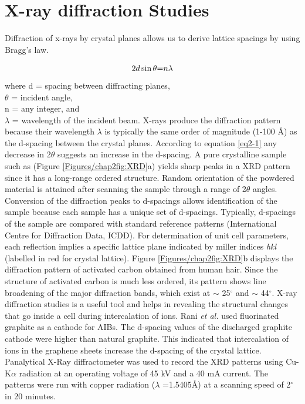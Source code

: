 \section{X-ray diffraction Studies}
Diffraction of x-rays by crystal planes allows us to derive lattice spacings by using Bragg's law. 

 \begin{equation} \label{eq2-1}
     2d\sin\theta \text= n{\lambda}
 \end{equation}
 where d = spacing between diffracting planes,\\
$\theta$ = incident angle,\\ 
n = any integer, and \\
$\lambda$ = wavelength of the incident beam. X-rays produce the diffraction pattern because their wavelength $\lambda$ is typically the same order of magnitude (1-100 \AA) as the d-spacing between the crystal planes. According to equation \ref{eq2-1} any decrease in 2$\theta$ suggests an increase in the d-spacing. 
A pure crystalline sample such as  (Figure \ref{Figures/chap2fig:XRD}a) yields sharp peaks in a XRD pattern since it has a long-range ordered structure. Random orientation of the powdered material is attained after scanning the sample through a range of 2$\theta$ angles. Conversion of the diffraction peaks to d-spacings allows identification of the sample because each sample has a unique set of d-spacings. Typically, d-spacings of the sample are compared with standard reference patterns (International Centre for Diffraction Data, ICDD). For determination of unit cell parameters, each reflection implies a specific lattice plane indicated by miller indices \textit{hkl} (labelled in red  for  crystal lattice). Figure \ref{Figures/chap2fig:XRD}b displays the diffraction pattern of activated carbon obtained from human hair. Since the structure of activated carbon is much less ordered, its pattern shows line broadening of the major diffraction bands, which exist at $\sim$ 25$^{\circ}$  and $\sim$ 44$^{\circ}$.
X-ray diffraction studies is a useful tool and helps in revealing the structural changes that go inside a cell during intercalation of ions. Rani \textit{et al.} used fluorinated graphite as a cathode for AIBs. The d-spacing values of the discharged graphite cathode were higher than natural graphite. This indicated that intercalation of  ions in the graphene sheets increase the d-spacing of the crystal lattice\cite{rani_fluorinated_2013}.
Panalytical X-Ray diffractometer was used to record the XRD patterns using Cu-K$\alpha$ radiation at an operating voltage of 45 kV and a 40 mA current. The patterns were run with copper radiation ($\lambda$ =1.5405\AA) at a scanning speed of 2$^{\circ}$ in 20 minutes. 

